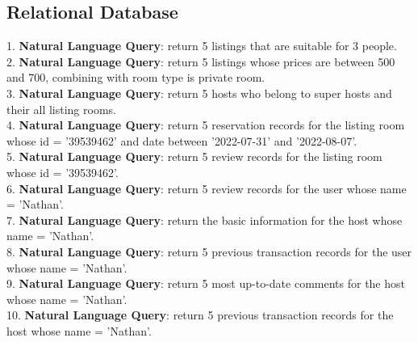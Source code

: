 \documentclass{article}
\begin{document}
	\subsection{Relational Database}
	1. \textbf{Natural Language Query}: return 5 listings that are suitable for 3 people.
	\vspace{3pt}
	\\
	2. \textbf{Natural Language Query}: return 5 listings whose prices are between 500 and 700, combining with room type is private room.
	\vspace{3pt}
	\\
	3. \textbf{Natural Language Query}: return 5 hosts who belong to super hosts and their all listing rooms.
	\vspace{3pt}
	\\
	4. \textbf{Natural Language Query}: return 5 reservation records for the listing room whose id = '39539462' and date between '2022-07-31' and '2022-08-07'.
	\vspace{3pt}
	\\
	5. \textbf{Natural Language Query}: return 5 review records for the listing room whose id = '39539462'.
	\vspace{3pt}
	\\
	6. \textbf{Natural Language Query}: return 5 review records for the user  whose name = 'Nathan'.
	\vspace{3pt}
	\\
	7. \textbf{Natural Language Query}: return the basic information for the host whose name = 'Nathan'.
	\vspace{3pt}
	\\
	8. \textbf{Natural Language Query}: return 5 previous transaction records for the user whose name = 'Nathan'.
	\vspace{3pt}
	\\
	9. \textbf{Natural Language Query}: return 5 most up-to-date comments for the host whose name = 'Nathan'.
	\vspace{3pt}
	\\
	10. \textbf{Natural Language Query}: return 5 previous transaction records for the host whose name = 'Nathan'.
\end{document}
